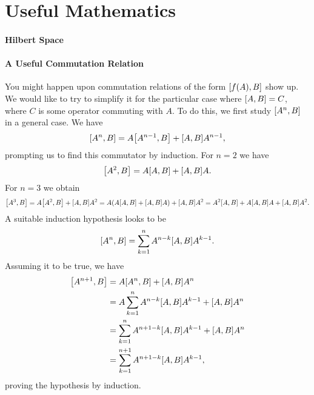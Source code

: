 \section{Useful Mathematics}

\paragraph{Hilbert Space}

\paragraph{A Useful Commutation Relation}
You might happen upon commutation relations of the form $\comm{f(A)}{B}$ show up. We would like to try to simplify it for the particular case where $\comm{A}{B} = C$, where $C$ is some operator commuting with $A$. To do this, we first study $\comm{A^{n}}{B}$ in a general case. We have
\begin{align*}
	\comm{A^{n}}{B} = A\comm{A^{n - 1}}{B} + \comm{A}{B}A^{n - 1},
\end{align*}
prompting us to find this commutator by induction. For $n = 2$ we have
\begin{align*}
	\comm{A^{2}}{B} = A\comm{A}{B} + \comm{A}{B}A.
\end{align*}
For $n = 3$ we obtain
\begin{align*}
	\comm{A^{3}}{B} = A\comm{A^{2}}{B} + \comm{A}{B}A^{2} = A(A\comm{A}{B} + \comm{A}{B}A) + \comm{A}{B}A^{2} = A^{2}\comm{A}{B} + A\comm{A}{B}A + \comm{A}{B}A^{2}.
\end{align*}
A suitable induction hypothesis looks to be
\begin{align*}
	\comm{A^{n}}{B} = \sum\limits_{k = 1}^{n}A^{n - k}\comm{A}{B}A^{k - 1}.
\end{align*}
Assuming it to be true, we have
\begin{align*}
	\comm{A^{n + 1}}{B} &= A\comm{A^{n}}{B} + \comm{A}{B}A^{n} \\
	                    &= A\sum\limits_{k = 1}^{n}A^{n - k}\comm{A}{B}A^{k - 1} + \comm{A}{B}A^{n} \\
	                    &= \sum\limits_{k = 1}^{n}A^{n + 1 - k}\comm{A}{B}A^{k - 1} + \comm{A}{B}A^{n} \\
	                    &= \sum\limits_{k = 1}^{n + 1}A^{n + 1 - k}\comm{A}{B}A^{k - 1},
\end{align*}
proving the hypothesis by induction.

